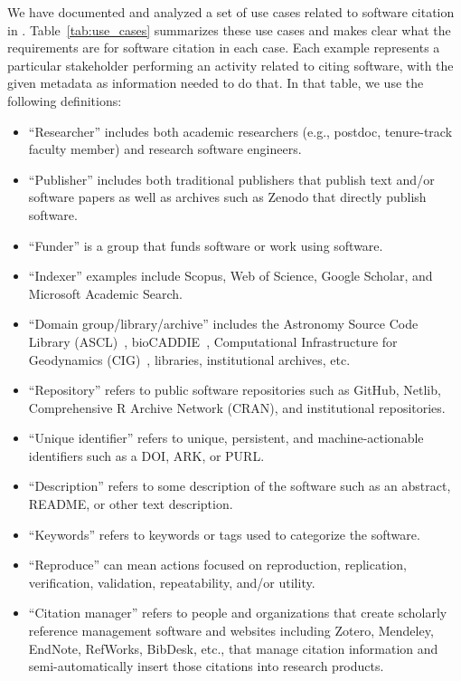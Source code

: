\documentclass[12pt, oneside]{amsart}
\begin{document}
We have documented and analyzed a set of use cases related to software citation
in \cite{SC-Use-Cases}. Table~\ref{tab:use_cases} summarizes these use cases and
makes clear what the requirements are for software citation in each case.
Each example represents a particular stakeholder performing an activity related to citing software, with the given metadata as information needed to do that.
In that table,
we use the following definitions:
\begin{itemize}

\item ``Researcher'' includes both academic researchers (e.g., postdoc,
tenure-track faculty member) and research software engineers.

\item ``Publisher'' includes both traditional publishers that publish text
and\slash or software papers as well as archives such as Zenodo that directly
publish software.

\item ``Funder'' is a group that funds software or work using software.

\item ``Indexer'' examples include Scopus, Web of Science, Google Scholar,
and Microsoft Academic Search.

\item ``Domain group\slash library\slash archive'' includes the Astronomy Source Code Library (ASCL)~\cite{ascl},
bioCADDIE~\cite{bioCADDIE}, Computational Infrastructure for Geodynamics (CIG)~\cite{CIG}, libraries, institutional archives, etc.

\item ``Repository'' refers to public software repositories such as GitHub, Netlib, Comprehensive R Archive
Network (CRAN), and institutional repositories.

\item ``Unique identifier'' refers to unique, persistent, and machine-actionable identifiers such as a DOI, ARK, or PURL.

\item ``Description'' refers to some description of the software such as an abstract, README, or other text description.

\item ``Keywords'' refers to keywords or tags used to categorize the software.

\item ``Reproduce'' can mean actions focused on reproduction, replication, verification, validation, repeatability, and\slash or utility.

\item ``Citation manager'' refers to people and organizations that create scholarly reference
management software and websites including Zotero, Mendeley, EndNote, RefWorks, BibDesk, etc.,
that manage citation information and semi-automatically insert those citations into research products.

\end{itemize}
\end{document}
